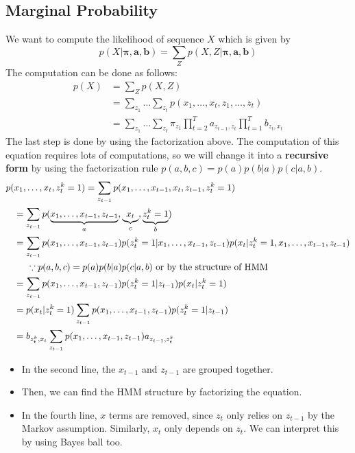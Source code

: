 \subsection{Marginal Probability}
We want to compute the likelihood of sequence $X$ which is given by
$$p(X|\boldsymbol{\pi}\mathbf{, a, b}) = \sum_Z p(X, Z|\boldsymbol{\pi}\mathbf{, a, b})$$
The computation can be done as follows:
\begin{align*}
	p(X) &= \sum_Z p(X,Z)\\
	& = \sum_{z_1}\dots\sum_{z_t}p(x_1,\dots,x_t,z_1,\dots,z_t)\\
	& = \sum_{z_1}\dots\sum_{z_t}\pi_{z_{1}}\prod_{t=2}^{T}a_{z_{t-1},z_t}\prod_{t=1}^{T}b_{z_{t},x_t}
\end{align*}
The last step is done by using the factorization above. The computation of this equation requires lots of computations, so we will change it into a \textbf{recursive form} by using the factorization rule $p(a,b,c) = p(a)p(b|a)p(c|a,b)$. 
\begin{align}
	p(&x_1,\dots,x_t,z_t^k=1) = \sum_{z_{t-1}}p(x_1,\dots,x_{t-1}, x_t,z_{t-1},z_t^k=1)\\
	&= \sum_{z_{t-1}} p(\underbrace{x_1,\dots,x_{t-1}, z_{t-1}}_{a}, \underbrace{x_t}_{c}, \underbrace{z_t^k=1}_{b})\\
	& = \sum_{z_{t-1}} p(x_1,\dots,x_{t-1},z_{t-1}) p(z_t^k=1|x_1,\dots,x_{t-1},z_{t-1})p(x_t|z_t^k=1, x_1,\dots,x_{t-1},z_{t-1}) \\
	&\hspace{0.5cm} \because p(a,b,c) = p(a)p(b|a)p(c|a,b) \textrm{ or by the structure of HMM}\nonumber\\ 
	& = \sum_{z_{t-1}} p(x_1,\dots,x_{t-1},z_{t-1}) p(z_t^k=1|z_{t-1}) p(x_t|z_t^k=1)\\
	& = p(x_t|z_t^k=1) \sum_{z_{t-1}} p(x_1,\dots,x_{t-1},z_{t-1}) p(z_t^k=1|z_{t-1}) \\
	& = b_{z^k_t,x_t} \sum_{z_{t-1}} p(x_1,\dots,x_{t-1},z_{t-1}) a_{z_{t-1},z_t^k}
	\label{eq:hmm_eval_fact}
\end{align}
\begin{itemize}
	\item In the second line, the $x_{t-1}$ and $z_{t-1}$ are grouped together. 
	\item Then, we can find the HMM structure by factorizing the equation. 
	\item In the fourth line, $x$ terms are removed, since $z_t$ only relies on $z_{t-1}$ by the Markov assumption. Similarly, $x_t$ only depends on $z_t$. We can interpret this by using Bayes ball too. 
\end{itemize}
